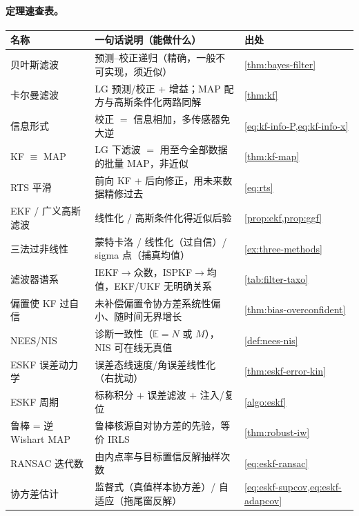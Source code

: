 \paragraph{定理速查表。}
\begin{table}[ht]\centering\small
\begin{tabular}{lll}
\toprule
名称 & 一句话说明（能做什么） & 出处 \\
\midrule
贝叶斯滤波 & 预测–校正递归（精确，一般不可实现，须近似） & \cref{thm:bayes-filter} \\
卡尔曼滤波 & LG 预测/校正 + 增益；MAP 配方与高斯条件化两路同解 & \cref{thm:kf} \\
信息形式 & 校正 $=$ 信息相加，多传感器免大逆 & \cref{eq:kf-info-P,eq:kf-info-x} \\
KF $\equiv$ MAP & LG 下滤波 $=$ 用至今全部数据的批量 MAP，非近似 & \cref{thm:kf-map} \\
RTS 平滑 & 前向 KF $+$ 后向修正，用未来数据精修过去 & \cref{eq:rts} \\
EKF / 广义高斯滤波 & 线性化 / 高斯条件化得近似后验 & \cref{prop:ekf,prop:ggf} \\
三法过非线性 & 蒙特卡洛 / 线性化（过自信）/ sigma 点（捕真均值） & \cref{ex:three-methods} \\
滤波器谱系 & IEKF$\to$众数，ISPKF$\to$均值，EKF/UKF 无明确关系 & \cref{tab:filter-taxo} \\
偏置使 KF 过自信 & 未补偿偏置令协方差系统性偏小、随时间无界增长 & \cref{thm:bias-overconfident} \\
NEES/NIS & 诊断一致性（$\mathbb{E}=N$ 或 $M$），NIS 可在线无真值 & \cref{def:nees-nis} \\
ESKF 误差动力学 & 误差态线速度/角误差线性化（右扰动） & \cref{thm:eskf-error-kin} \\
ESKF 周期 & 标称积分 $+$ 误差滤波 $+$ 注入/复位 & \cref{algo:eskf} \\
鲁棒 = 逆 Wishart MAP & 鲁棒核源自对协方差的先验，等价 IRLS & \cref{thm:robust-iw} \\
RANSAC 迭代数 & 由内点率与目标置信反解抽样次数 & \cref{eq:eskf-ransac} \\
协方差估计 & 监督式（真值样本协方差）/ 自适应（拖尾窗反解） & \cref{eq:eskf-supcov,eq:eskf-adapcov} \\
\bottomrule
\end{tabular}
\end{table}

